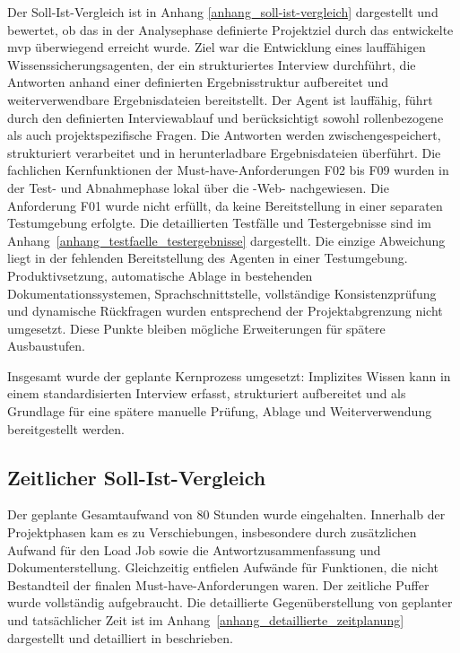 \documentclass[
  10pt,
  ngerman,
  a4paper,
  toc=graduated,
  numbers=noenddot,
  headings=standardclasses,
  nonumberlist
]{scrartcl}
\begin{document}
Der Soll-Ist-Vergleich ist in Anhang \ref{anhang_soll-ist-vergleich} dargestellt und bewertet, ob das in der Analysephase definierte Projektziel durch das entwickelte \gls{mvp} überwiegend erreicht wurde. Ziel war die Entwicklung eines lauffähigen Wissenssicherungsagenten, der ein strukturiertes Interview durchführt, die Antworten anhand einer definierten Ergebnisstruktur aufbereitet und weiterverwendbare Ergebnisdateien bereitstellt. Der Agent ist lauffähig, führt durch den definierten Interviewablauf und berücksichtigt sowohl rollenbezogene als auch projektspezifische Fragen. Die Antworten werden zwischengespeichert, strukturiert verarbeitet und in herunterladbare Ergebnisdateien überführt. Die fachlichen Kernfunktionen der Must-have-Anforderungen F02 bis F09 wurden in der Test- und Abnahmephase lokal über die -Web- nachgewiesen. Die Anforderung F01 wurde nicht erfüllt, da keine Bereitstellung in einer separaten Testumgebung erfolgte. Die detaillierten Testfälle und Testergebnisse sind im Anhang~\ref{anhang_testfaelle_testergebnisse} dargestellt. Die einzige Abweichung liegt in der fehlenden Bereitstellung des Agenten in einer Testumgebung. Produktivsetzung, automatische Ablage in bestehenden Dokumentationssystemen, Sprachschnittstelle, vollständige Konsistenzprüfung und dynamische Rückfragen wurden entsprechend der Projektabgrenzung nicht umgesetzt. Diese Punkte bleiben mögliche Erweiterungen für spätere Ausbaustufen. 

Insgesamt wurde der geplante Kernprozess umgesetzt: Implizites Wissen kann in einem standardisierten Interview erfasst, strukturiert aufbereitet und als Grundlage für eine spätere manuelle Prüfung, Ablage und Weiterverwendung bereitgestellt werden.

\subsection{Zeitlicher Soll-Ist-Vergleich}
\label{zeitlicher_soll_ist_vergleich}
Der geplante Gesamtaufwand von 80 Stunden wurde eingehalten. Innerhalb der Projektphasen kam es zu Verschiebungen, insbesondere durch zusätzlichen Aufwand für den Load Job sowie die Antwortzusammenfassung und Dokumenterstellung. Gleichzeitig entfielen Aufwände für Funktionen, die nicht Bestandteil der finalen Must-have-Anforderungen waren. Der zeitliche Puffer wurde vollständig aufgebraucht. Die detaillierte Gegenüberstellung von geplanter und tatsächlicher Zeit ist im Anhang~\ref{anhang_detaillierte_zeitplanung} dargestellt und detailliert in  beschrieben.
\end{document}
